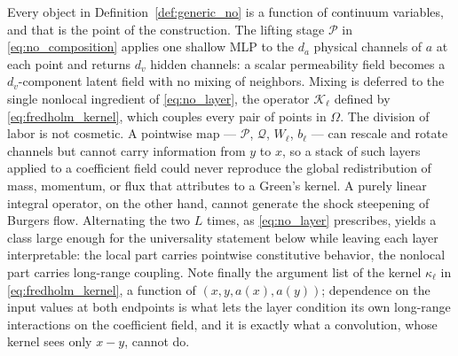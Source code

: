 Every object in Definition~\ref{def:generic_no} is a function of continuum variables, and that is the point of the construction. The lifting stage $\mathcal{P}$ in \eqref{eq:no_composition} applies one shallow MLP to the $d_{a}$ physical channels of $a$ at each point and returns $d_{v}$ hidden channels: a scalar permeability field becomes a $d_{v}$-component latent field with no mixing of neighbors. Mixing is deferred to the single nonlocal ingredient of \eqref{eq:no_layer}, the operator $\mathcal{K}_{\ell}$ defined by \eqref{eq:fredholm_kernel}, which couples every pair of points in $\Omega$. The division of labor is not cosmetic. A pointwise map --- $\mathcal{P}$, $\mathcal{Q}$, $W_{\ell}$, $b_{\ell}$ --- can rescale and rotate channels but cannot carry information from $y$ to $x$, so a stack of such layers applied to a coefficient field could never reproduce the global redistribution of mass, momentum, or flux that  attributes to a Green's kernel. A purely linear integral operator, on the other hand, cannot generate the shock steepening of Burgers flow. Alternating the two $L$ times, as \eqref{eq:no_layer} prescribes, yields a class large enough for the universality statement below while leaving each layer interpretable: the local part carries pointwise constitutive behavior, the nonlocal part carries long-range coupling. Note finally the argument list of the kernel $\kappa_{\ell}$ in \eqref{eq:fredholm_kernel}, a function of $(x,y,a(x),a(y))$; dependence on the input values at both endpoints is what lets the layer condition its own long-range interactions on the coefficient field, and it is exactly what a convolution, whose kernel sees only $x-y$, cannot do.

